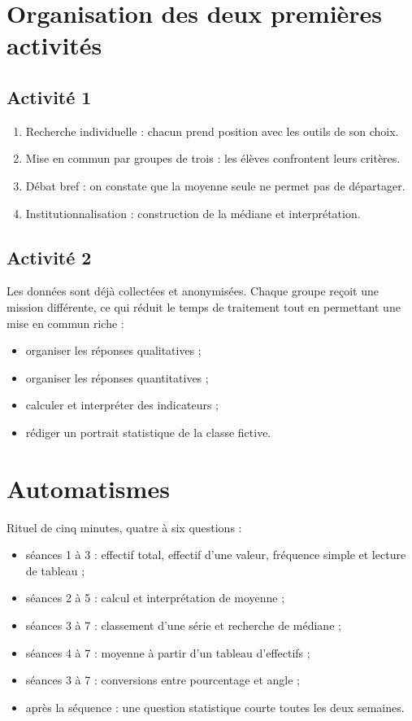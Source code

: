 \documentclass[12pt,a4paper]{article}
\begin{document}
\section*{Organisation des deux premières activités}

\subsection*{Activité 1}

\begin{enumerate}
  \item Recherche individuelle : chacun prend position avec les outils de son choix.
  \item Mise en commun par groupes de trois : les élèves confrontent leurs critères.
  \item Débat bref : on constate que la moyenne seule ne permet pas de départager.
  \item Institutionnalisation : construction de la médiane et interprétation.
\end{enumerate}

\subsection*{Activité 2}

Les données sont déjà collectées et anonymisées.
Chaque groupe reçoit une mission différente, ce qui réduit le temps
de traitement tout en permettant une mise en commun riche :

\begin{itemize}
  \item organiser les réponses qualitatives ;
  \item organiser les réponses quantitatives ;
  \item calculer et interpréter des indicateurs ;
  \item rédiger un portrait statistique de la classe fictive.
\end{itemize}

\section*{Automatismes}

Rituel de cinq minutes, quatre à six questions :

\begin{itemize}
  \item séances 1 à 3 : effectif total, effectif d'une valeur,
        fréquence simple et lecture de tableau ;
  \item séances 2 à 5 : calcul et interprétation de moyenne ;
  \item séances 3 à 7 : classement d'une série et recherche de médiane ;
  \item séances 4 à 7 : moyenne à partir d'un tableau d'effectifs ;
  \item séances 3 à 7 : conversions entre pourcentage et angle ;
  \item après la séquence : une question statistique courte toutes les deux semaines.
\end{itemize}
\end{document}
